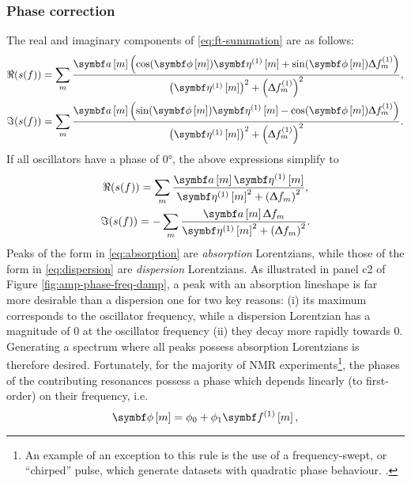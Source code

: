 \subsubsection{Phase correction}
The real and imaginary components of \eqref{eq:ft-summation} are as follows:
\begin{subequations}
    \begin{gather}
        \Re(s(f)) = \sum_m
        \frac{\bdam \left(\cos(\bdphim) \bdetaonem + \sin(\bdphim) \Updelta f^{(1)}_m\right)}
        {\left(\bdetaonem\right)^2 + \left( \Updelta f^{(1)}_m \right)^2},\\
        \Im(s(f)) = \sum_m
        \frac{\bdam \left(\sin(\bdphim) \bdetaonem - \cos(\bdphim) \Updelta f^{(1)}_m\right)}
        {\left(\bdetaonem\right)^2 + \left( \Updelta f^{(1)}_m \right)^2}.
    \end{gather}
\end{subequations}
If all oscillators have a phase of \ang{0}, the above expressions simplify to
\begin{subequations}
    \begin{gather}
        \Re(s(f)) = \sum_m
        \frac{\bdam \bdetaonem}
        {\bdetaonem^2 + \left( \Updelta f_m \right)^2},
        \label{eq:absorption}\\
        \Im(s(f)) = -\sum_m
        \frac{\bdam \Updelta f_m}
        {\bdetaonem^2 + \left( \Updelta f_m \right)^2}.
        \label{eq:dispersion}
    \end{gather}
\end{subequations}
Peaks of the form in \eqref{eq:absorption} are \emph{absorption} Lorentzians,
while those of the form in \eqref{eq:dispersion} are \emph{dispersion}
Lorentzians. As illustrated in panel c2 of Figure
\ref{fig:amp-phase-freq-damp}, a peak with an absorption lineshape is far more
desirable than a dispersion one for two key reasons: (i) its maximum
corresponds to the oscillator frequency, while a dispersion Lorentzian
has a magnitude of $0$ at the oscillator frequency (ii) they decay more rapidly
towards $0$. Generating a spectrum where all peaks possess absorption
Lorentzians is therefore desired. Fortunately, for the majority of \ac{NMR} experiments\footnote{
    An example of an exception to this rule is the use of a frequency-swept, or
    ``chirped'' pulse, which generate datasets with quadratic phase behaviour.
    .
}, the phases of the contributing resonances possess a phase which depends
linearly (to first-order) on their frequency, i.e.
\begin{equation}
    \bdphim = \phi_0 + \phi_1 \bdfonem,
\end{equation}
